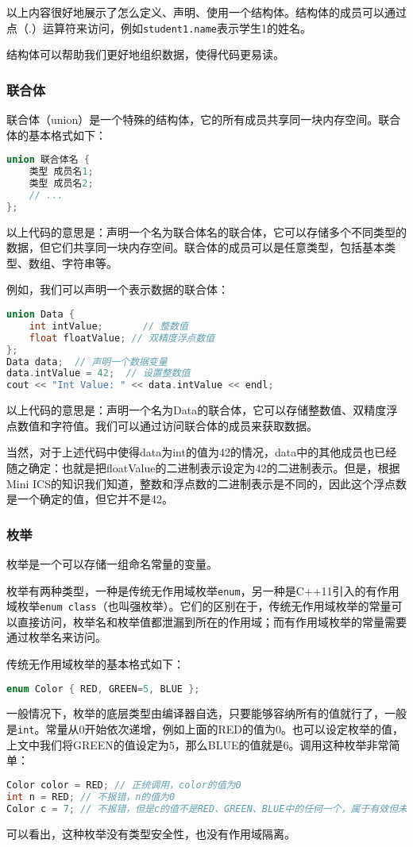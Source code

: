 \documentclass[../main.tex]{subfiles}
\begin{document}
以上内容很好地展示了怎么定义、声明、使用一个结构体。结构体的成员可以通过点（.）运算符来访问，例如\texttt{student1.name}表示学生1的姓名。

结构体可以帮助我们更好地组织数据，使得代码更易读。

\subsubsection{联合体}

联合体（union）是一个特殊的结构体，它的所有成员共享同一块内存空间。联合体的基本格式如下：
\begin{lstlisting}[language=C++]
union 联合体名 {
    类型 成员名1;
    类型 成员名2;
    // ...
};
\end{lstlisting}
以上代码的意思是：声明一个名为联合体名的联合体，它可以存储多个不同类型的数据，但它们共享同一块内存空间。联合体的成员可以是任意类型，包括基本类型、数组、字符串等。

例如，我们可以声明一个表示数据的联合体：
\begin{lstlisting}[language=C++]
union Data {
    int intValue;       // 整数值
    float floatValue; // 双精度浮点数值
};
Data data;  // 声明一个数据变量
data.intValue = 42;  // 设置整数值
cout << "Int Value: " << data.intValue << endl;
\end{lstlisting}
以上代码的意思是：声明一个名为Data的联合体，它可以存储整数值、双精度浮点数值和字符值。我们可以通过访问联合体的成员来获取数据。

当然，对于上述代码中使得data为int的值为42的情况，data中的其他成员也已经随之确定：也就是把floatValue的二进制表示设定为42的二进制表示。但是，根据Mini ICS的知识我们知道，整数和浮点数的二进制表示是不同的，因此这个浮点数是一个确定的值，但它并不是42。

\subsubsection{枚举}

枚举是一个可以存储一组命名常量的变量。

枚举有两种类型，一种是传统无作用域枚举\texttt{enum}，另一种是C++11引入的有作用域枚举\texttt{enum class}（也叫强枚举）。它们的区别在于，传统无作用域枚举的常量可以直接访问，枚举名和枚举值都泄漏到所在的作用域；而有作用域枚举的常量需要通过枚举名来访问。

传统无作用域枚举的基本格式如下：
\begin{lstlisting}[language=C++]
    enum Color { RED, GREEN=5, BLUE };
\end{lstlisting}
一般情况下，枚举的底层类型由编译器自选，只要能够容纳所有的值就行了，一般是\texttt{int}。常量从0开始依次递增，例如上面的RED的值为0。也可以设定枚举的值，上文中我们将GREEN的值设定为5，那么BLUE的值就是6。调用这种枚举非常简单：
\begin{lstlisting}[language=C++]
Color color = RED; // 正统调用，color的值为0
int n = RED; // 不报错，n的值为0
Color c = 7; // 不报错，但是c的值不是RED、GREEN、BLUE中的任何一个，属于有效但未命名的值
\end{lstlisting}
可以看出，这种枚举没有类型安全性，也没有作用域隔离。
\end{document}
